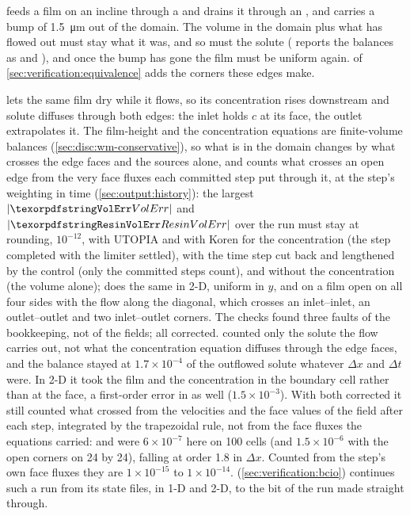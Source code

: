  feeds a film on an incline through a 
and drains it through an , and carries a bump of
\SI{1.5}{\micro\metre} out of the domain. The volume in the domain plus what
has flowed out must stay what it was, and so must the solute
( reports the balances as  and
), and once the bump has gone the film must be uniform
again.  of \cref{sec:verification:equivalence} adds
the corners these edges make.

 lets the same film dry while it flows, so its
concentration rises downstream and solute diffuses through both edges: the
inlet holds $c$ at its face, the outlet extrapolates it. The film-height and
the concentration equations are finite-volume balances
(\cref{sec:disc:wm-conservative}), so what is in the domain changes by what
crosses the edge faces and the sources alone, and  counts
what crosses an open edge from the very face fluxes each committed step put
through it, at the step's weighting in time (\cref{sec:output:history}): the
largest $|\code{VolErr}|$ and $|\code{ResinVolErr}|$ over the run must stay
at rounding, $10^{-12}$, with UTOPIA and with Koren for the concentration
(the step completed with the limiter settled), with the time step cut back
and lengthened by the control (only the committed steps count), and without
the concentration (the volume alone);  does the same
in 2-D, uniform in $y$, and on a film open on all four sides with the flow
along the diagonal, which crosses an inlet--inlet, an outlet--outlet and two
inlet--outlet corners. The checks found three faults of the bookkeeping, not
of the fields; all corrected.  counted only the solute the
flow carries out, not what the concentration equation diffuses through the
edge faces, and the balance stayed at $1.7\times10^{-4}$ of the outflowed
solute whatever $\Delta x$ and $\Delta t$ were. In 2-D it took the film and
the concentration in the boundary cell rather than at the face, a
first-order error in  as well ($1.5\times10^{-3}$). With both
corrected it still counted what crossed from the velocities and the face
values of the field after each step, integrated by the trapezoidal rule,
not from the face fluxes the equations carried:  and
 were $6\times10^{-7}$ here on 100 cells (and
$1.5\times10^{-6}$ with the open corners on 24 by 24), falling at order 1.8
in $\Delta x$. Counted from the step's own face fluxes they are
$1\times10^{-15}$ to $1\times10^{-14}$. 
(\cref{sec:verification:bcio}) continues such a run from its state files, in
1-D and 2-D, to the bit of the run made straight through.

